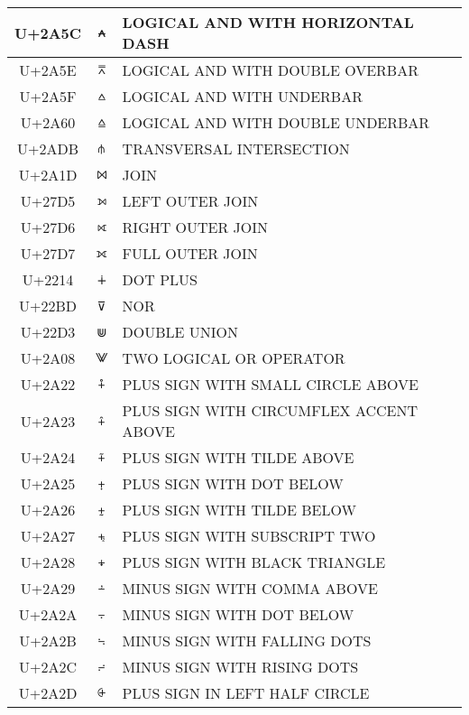 \documentclass[a4paper]{article}
\begin{document}
\begin{longtable}{ccl}
  U+2A5C & \texttt{⩜}  & LOGICAL AND WITH HORIZONTAL DASH \\ \hline
  U+2A5E & \texttt{⩞}  & LOGICAL AND WITH DOUBLE OVERBAR \\ \hline
  U+2A5F & \texttt{⩟}  & LOGICAL AND WITH UNDERBAR \\ \hline
  U+2A60 & \texttt{⩠}  & LOGICAL AND WITH DOUBLE UNDERBAR \\ \hline
  U+2ADB & \texttt{⫛}  & TRANSVERSAL INTERSECTION \\ \hline
  U+2A1D & \texttt{⨝}  & JOIN \\ \hline
  U+27D5 & \texttt{⟕}  & LEFT OUTER JOIN \\ \hline
  U+27D6 & \texttt{⟖}  & RIGHT OUTER JOIN \\ \hline
  U+27D7 & \texttt{⟗}  & FULL OUTER JOIN \\ \hline
  U+2214 & \texttt{∔}  & DOT PLUS \\ \hline
  U+22BD & \texttt{⊽}  & NOR \\ \hline
  U+22D3 & \texttt{⋓}  & DOUBLE UNION \\ \hline
  U+2A08 & \texttt{⨈}  & TWO LOGICAL OR OPERATOR \\ \hline
  U+2A22 & \texttt{⨢}  & PLUS SIGN WITH SMALL CIRCLE ABOVE \\ \hline
  U+2A23 & \texttt{⨣}  & PLUS SIGN WITH CIRCUMFLEX ACCENT ABOVE \\ \hline
  U+2A24 & \texttt{⨤}  & PLUS SIGN WITH TILDE ABOVE \\ \hline
  U+2A25 & \texttt{⨥}  & PLUS SIGN WITH DOT BELOW \\ \hline
  U+2A26 & \texttt{⨦}  & PLUS SIGN WITH TILDE BELOW \\ \hline
  U+2A27 & \texttt{⨧}  & PLUS SIGN WITH SUBSCRIPT TWO \\ \hline
  U+2A28 & \texttt{⨨}  & PLUS SIGN WITH BLACK TRIANGLE \\ \hline
  U+2A29 & \texttt{⨩}  & MINUS SIGN WITH COMMA ABOVE \\ \hline
  U+2A2A & \texttt{⨪}  & MINUS SIGN WITH DOT BELOW \\ \hline
  U+2A2B & \texttt{⨫}  & MINUS SIGN WITH FALLING DOTS \\ \hline
  U+2A2C & \texttt{⨬}  & MINUS SIGN WITH RISING DOTS \\ \hline
  U+2A2D & \texttt{⨭}  & PLUS SIGN IN LEFT HALF CIRCLE \\ \hline

\end{longtable}
\end{document}
